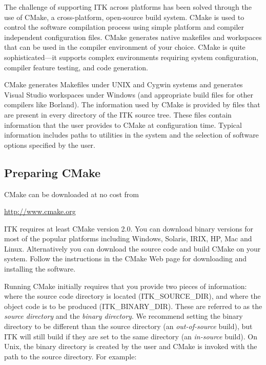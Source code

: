 The challenge of supporting ITK across platforms has been solved through the
use of CMake, a cross-platform, open-source build system. CMake is used to
control the software compilation process using simple platform and compiler
independent configuration files.  CMake generates native makefiles and
workspaces that can be used in the compiler environment of your choice. CMake
is quite sophisticated---it supports complex environments requiring system
configuration, compiler feature testing, and code generation.

CMake generates Makefiles under UNIX and Cygwin systems and generates Visual
Studio workspaces under Windows (and appropriate build files for other
compilers like Borland). The information used by CMake is provided by
 files that are present in every directory of the ITK
source tree. These files contain information that the user
provides to CMake at configuration time. Typical information includes paths
to utilities in the system and the selection of software options specified by
the user.

\subsection{Preparing CMake}
\label{sec:CMakeforITK}
 

CMake can be downloaded at no cost from 
\begin{center} 
  \url{http://www.cmake.org}
\end{center}

ITK requires at least CMake version 2.0. You can download binary
versions for most of the popular platforms including Windows, Solaris,
IRIX, HP, Mac and Linux. Alternatively you can download the source
code and build CMake on your system. Follow the instructions in the
CMake Web page for downloading and installing the software.

Running CMake initially requires that you provide two pieces of
information: where the source code directory is located
(ITK\_SOURCE\_DIR), and where the object code is to be produced
(ITK\_BINARY\_DIR). These are referred to as the \emph{source
directory} and the \emph{binary directory}. We recommend setting the
binary directory to be different than the source directory (an
\emph{out-of-source} build), but ITK will still build if they are set
to the same directory (an \emph{in-source} build).  On Unix, the
binary directory is created by the user and CMake is invoked with the
path to the source directory. For example:

